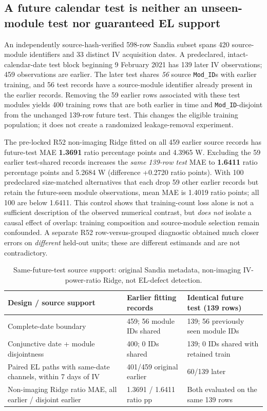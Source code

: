 \documentclass[10pt,a4paper]{article}
\begin{document}
\subsection{A future calendar test is neither an unseen-module test nor guaranteed EL support}
An independently source-hash-verified 598-row Sandia subset spans 420 source-module identifiers and 33 distinct IV acquisition dates. A predeclared, intact-calendar-date test block beginning 9 February 2021 has 139 later IV observations; 459 observations are earlier. The later test shares \emph{56} source \texttt{Mod\_ID}s with earlier training, and 56 test records have a source-module identifier already present in the earlier records. Removing the 59 earlier rows associated with these test modules yields 400 training rows that are both earlier in time and \texttt{Mod\_ID}-disjoint from the unchanged 139-row future test. This changes the eligible training population; it does not create a randomized leakage-removal experiment.

The pre-locked R52 non-imaging Ridge fitted on all 459 earlier source records has future-test MAE \textbf{1.3691} ratio percentage points and 4.3965 W. Excluding the 59 earlier test-shared records increases the \emph{same 139-row test} MAE to \textbf{1.6411} ratio percentage points and 5.2684 W (difference +0.2720 ratio points). With 100 predeclared size-matched alternatives that each drop 59 other earlier records but retain the future-seen module observations, mean MAE is 1.4019 ratio points; all 100 are below 1.6411. This control shows that training-count loss alone is not a sufficient description of the observed numerical contrast, but \emph{does not} isolate a causal effect of overlap: training composition and source-module selection remain confounded. A separate R52 row-versus-grouped diagnostic obtained much closer errors on \emph{different} held-out units; these are different estimands and are not contradictory.

\begin{table}[ht]\centering\small
\caption{Same-future-test source support: original Sandia metadata, non-imaging IV-power-ratio Ridge, not EL-defect detection.}
\begin{tabularx}{\linewidth}{@{}p{4.0cm}X X@{}}\toprule
Design / source support & Earlier fitting records & Identical future test (139 rows) \\ \midrule
Complete-date boundary & 459; 56 module IDs shared & 139; 56 previously seen module IDs \\
Conjunctive date + module disjointness & 400; 0 IDs shared & 139; 0 IDs shared with retained train \\
Paired EL paths with same-date channels, within 7 days of IV & 401/459 original earlier & 60/139 later \\
Non-imaging Ridge ratio MAE, all earlier / disjoint earlier & 1.3691 / 1.6411 ratio pp & Both evaluated on the same 139 rows \\
\bottomrule\end{tabularx}
\end{table}
\end{document}
